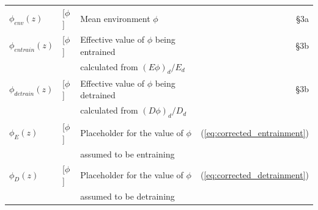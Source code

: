 \documentclass[12pt]{article}
\begin{document}
\begin{appendix}
\begin{table}[t]
\begin{center}
\begin{tabular}{lllr}
 $\phi_{env}(z)$ 
    & [$\phi$]
    & Mean environment $\phi$
    & \S 3a \\

 $\phi_{entrain}(z)$
    & [$\phi$]
    & Effective value of $\phi$ being entrained
    & \S 3b \\
   && calculated from $(E\phi)_d/E_d$& \\

 $\phi_{detrain}(z)$
    & [$\phi$]
    & Effective value of $\phi$ being detrained
    & \S 3b \\
   && calculated from $(D\phi)_d/D_d$ & \\

 $\phi_E(z)$
    & [$\phi$]
    & Placeholder for the value of $\phi$
    & (\ref{eq:corrected_entrainment}) \\
   && assumed to be entraining & \\

 $\phi_D(z)$
    & [$\phi$]
    & Placeholder for the value of $\phi$
    & (\ref{eq:corrected_detrainment}) \\
   && assumed to be detraining & \\
\hline
\end{tabular}
\end{center}
\end{table}

\end{appendix}



{}
{\clearpage}



\end{document}
